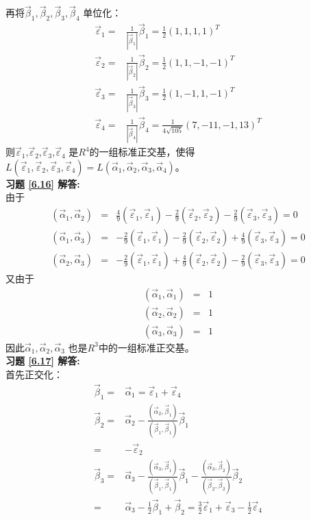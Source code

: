 \documentclass[a4paper]{book}
\begin{document}
再将$\vec{\beta}_1,\vec{\beta}_2,\vec{\beta}_3,\vec{\beta}_4$ 单位化：
\begin{align*}
\vec{\varepsilon}_1=&\frac{1}{|\vec{\beta}_1|}\vec{\beta}_1=\frac{1}{2}(1,1,1,1)^T\\
\vec{\varepsilon}_2=&\frac{1}{|\vec{\beta}_2|}\vec{\beta}_2=\frac{1}{2}(1,1,-1,-1)^T\\
\vec{\varepsilon}_3=&\frac{1}{|\vec{\beta}_3|}\vec{\beta}_3=\frac{1}{2}(1,-1,1,-1)^T\\
\vec{\varepsilon}_4=&\frac{1}{|\vec{\beta}_4|}\vec{\beta}_4=\frac{1}{4\sqrt{105}}(7,-11,-1,13)^T
\end{align*}
则$\vec{\varepsilon}_1$,$\vec{\varepsilon}_2$,$\vec{\varepsilon}_3$,$\vec{\varepsilon}_4$ 是$R^4$的一组标准正交基，使得
$L(\vec{\varepsilon}_1,\vec{\varepsilon}_2,\vec{\varepsilon}_3,\vec{\varepsilon}_4)=L(\vec{\alpha}_1,\vec{\alpha}_2,\vec{\alpha}_3,\vec{\alpha}_4)$。\\
\textbf{习题 \ref{6.16} 解答:}\\
由于
\begin{eqnarray*}
   (\vec{\alpha}_1,\vec{\alpha}_2)&=&\frac{4}{9}(\vec{\varepsilon}_1,\vec{\varepsilon}_1)
   -\frac{2}{9}(\vec{\varepsilon}_2,\vec{\varepsilon}_2)-\frac{2}{9}(\vec{\varepsilon}_3,\vec{\varepsilon}_3)=0\\
   (\vec{\alpha}_1,\vec{\alpha}_3)&=&-\frac{2}{9}(\vec{\varepsilon}_1,\vec{\varepsilon}_1)
   -\frac{2}{9}(\vec{\varepsilon}_2,\vec{\varepsilon}_2)+\frac{4}{9}(\vec{\varepsilon}_3,\vec{\varepsilon}_3)=0\\
   (\vec{\alpha}_2,\vec{\alpha}_3)&=&-\frac{2}{9}(\vec{\varepsilon}_1,\vec{\varepsilon}_1)
   +\frac{4}{9}(\vec{\varepsilon}_2,\vec{\varepsilon}_2)-\frac{2}{9}(\vec{\varepsilon}_3,\vec{\varepsilon}_3)=0
\end{eqnarray*}
又由于
\begin{eqnarray*}
   (\vec{\alpha}_1,\vec{\alpha}_1)&=&1\\
   (\vec{\alpha}_2,\vec{\alpha}_2)&=&1\\
   (\vec{\alpha}_3,\vec{\alpha}_3)&=&1
\end{eqnarray*}
因此$\vec{\alpha}_1,\vec{\alpha}_2,\vec{\alpha}_3$ 也是$R^3$中的一组标准正交基。\\
\textbf{习题 \ref{6.17} 解答:}\\
首先正交化：
\begin{align*}
\vec{\beta}_1=&\vec{\alpha}_1=\vec{\varepsilon}_1+\vec{\varepsilon}_4\\
\vec{\beta}_2=&\vec{\alpha}_2-\frac{(\vec{\alpha}_2,\vec{\beta}_1)}{(\vec{\beta}_1,\vec{\beta}_1)}\vec{\beta}_1\\
             =&-\vec{\varepsilon}_2\\
\vec{\beta}_3=&\vec{\alpha}_3-\frac{(\vec{\alpha}_3,\vec{\beta}_1)}{(\vec{\beta}_1,\vec{\beta}_1)}\vec{\beta}_1-
              \frac{(\vec{\alpha}_3,\vec{\beta}_2)}{(\vec{\beta}_2,\vec{\beta}_2)}\vec{\beta}_2\\
             =&\vec{\alpha}_3-\frac{1}{2}\vec{\beta}_1+\vec{\beta}_2=\frac{3}{2}\vec{\varepsilon}_1+\vec{\varepsilon}_3-\frac{1}{2}\vec{\varepsilon}_4
\end{align*}
\end{document}
